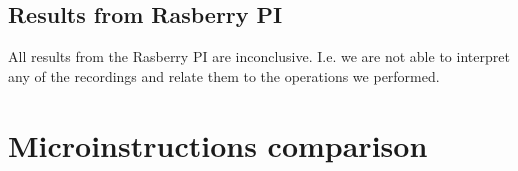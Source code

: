 
\subsection{Results from Rasberry PI}\label{chp5:subsec:rb_bk_results}
All results from the Rasberry PI are inconclusive. 
I.e. we are not able to interpret any of the recordings and relate them to the operations we performed.

\section{Microinstructions comparison}

